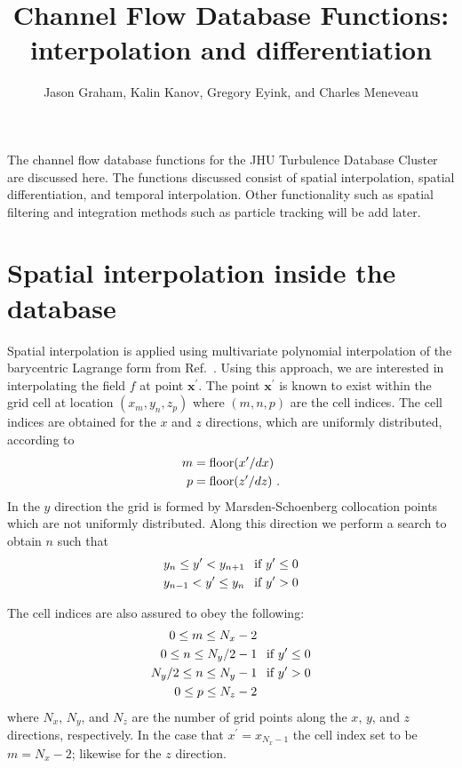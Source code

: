 \documentclass[11pt,letterpaper]{article}
\author{Jason Graham, Kalin Kanov, Gregory Eyink, and Charles Meneveau}
\title{Channel Flow Database Functions: interpolation and differentiation}
\begin{document}
\maketitle
The channel flow database functions for the JHU Turbulence Database Cluster are discussed here. The functions discussed consist of spatial interpolation, spatial differentiation, and temporal interpolation. Other functionality such as spatial filtering and integration methods such as particle tracking will be add later.
%
\section{Spatial interpolation inside the database}\label{sec:interp}
Spatial interpolation is applied using multivariate polynomial interpolation
of the barycentric Lagrange form from Ref.~\cite{Berrut2004}. Using this
approach, we are interested in interpolating the field $f$ at point
$\bm{x}^\prime$. The point $\bm{x}^\prime$ is known to exist within the grid
cell at location $(x_m,y_n,z_p)$ where $(m,n,p)$ are the cell indices. The cell
indices are obtained for the $x$ and $z$ directions, which are uniformly
distributed, according to
\begin{align}
  m &= \text{floor}( x^\prime / dx ) \\
  p &= \text{floor}( z^\prime / dz ) \mbox{ .} \notag
\end{align}
In the $y$ direction the grid is formed by Marsden-Schoenberg collocation points
which are not uniformly distributed. Along this direction we perform a search to obtain $n$ such that 
\begin{align}
  y_n  \leq y^\prime < y_{n+1} &\text{\hspace{1ex} if } y^\prime \leq 0 \\
  y_{n-1} < y^\prime \leq y_n &\text{\hspace{1ex} if } y^\prime > 0 \notag
\end{align}

The cell indices are also assured to obey the following:
\begin{align}
  0 \leq m \leq N_x - 2 & \notag \\
  0 \leq n \leq N_y/2 - 1 &\text{\hspace{1ex} if } y^\prime \leq 0 \\
  N_y/2 \leq n \leq N_y - 1 &\text{\hspace{1ex} if } y^\prime > 0 \notag \\
  0 \leq p \leq N_z - 2 &\notag
\end{align}
where $N_x$, $N_y$, and $N_z$ are the number of grid points along the $x$, $y$, and
$z$ directions, respectively. In the case that $x^\prime = x_{N_x-1}$ the cell index set to be $m=N_x-2$; likewise for the $z$ direction.
 
\end{document}
